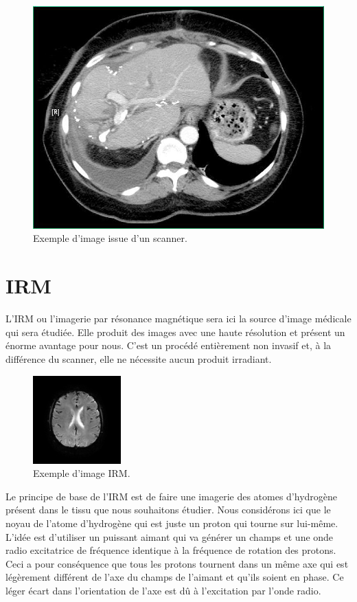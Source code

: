 \begin{figure}[H]
\centering
    \includegraphics[scale=0.4,angle=0]{Images/Scanner.jpg}
    \caption{Exemple d'image issue d'un scanner.}
    \label{fig:m_1407858437}
\end{figure}

\section{IRM}

L'IRM ou l'imagerie par résonance magnétique sera ici la source d'image médicale qui sera étudiée. Elle produit des images avec une haute résolution et présent un énorme avantage pour nous. C'est un procédé entièrement non invasif et, à la différence du scanner, elle ne nécessite aucun produit irradiant.

\begin{figure}[H]
\centering
    \includegraphics[scale=2,angle=0]{Images/Im7.png}
    \caption{Exemple d'image IRM.}
    \label{fig:m_1407858437}
\end{figure}

Le principe de base de l'IRM est de faire une imagerie des atomes d'hydrogène présent dans le tissu que nous souhaitons étudier. Nous considérons ici que le noyau de l'atome d'hydrogène qui est juste un proton qui tourne sur lui-même. L'idée est d'utiliser un puissant aimant qui va générer un champs et une onde radio excitatrice de fréquence identique à la fréquence de rotation des protons. Ceci a pour conséquence que tous les protons tournent dans un même axe qui est légèrement différent de l'axe du champs de l'aimant et qu'ils soient en phase. Ce léger écart dans l'orientation de l'axe est dû à l'excitation par l'onde radio.

